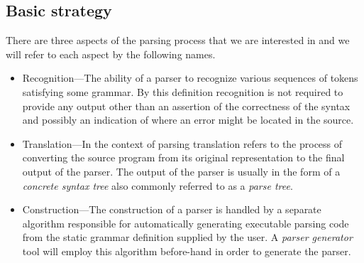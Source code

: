 \documentclass[a4paper,11pt]{article}
\begin{document}
\subsection{Basic strategy}

There are three aspects of the parsing process that we are interested in and we will refer to each aspect by the following names.
\begin{itemize}
\item Recognition---The ability of a parser to recognize various sequences of tokens satisfying some grammar. By this definition recognition is not required to provide any output other than an assertion of the correctness of the syntax and possibly an indication of where an error might be located in the source.
\item Translation---In the context of parsing translation refers to the process of converting the source program from its original representation to the final output of the parser. The output of the parser is usually in the form of a \emph{concrete syntax tree} also commonly referred to as a \emph{parse tree}.
\item Construction---The construction of a parser is handled by a separate algorithm responsible for automatically generating executable parsing code from the static grammar definition supplied by the user. A \emph{parser generator} tool will employ this algorithm before-hand in order to generate the parser.
\end{itemize}
\end{document}
